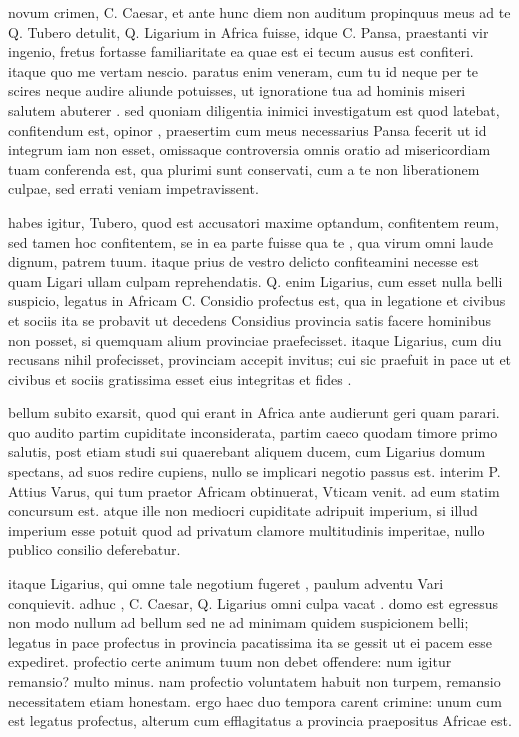 
 novum crimen, C. Caesar, et ante hunc diem non auditum propinquus meus ad te Q. Tubero detulit, Q. Ligarium in Africa fuisse, idque C. Pansa, praestanti vir ingenio, fretus fortasse familiaritate ea quae est ei tecum ausus est confiteri. itaque quo me vertam nescio. paratus enim veneram, cum tu id neque per te scires neque audire aliunde potuisses, ut ignoratione tua ad hominis miseri salutem abuterer . sed quoniam diligentia inimici investigatum est quod latebat, confitendum est, opinor , praesertim cum meus necessarius Pansa fecerit ut id integrum iam non esset, omissaque controversia omnis oratio ad misericordiam tuam conferenda est, qua plurimi sunt conservati, cum a te non liberationem culpae, sed errati veniam impetravissent.

 habes igitur, Tubero, quod est accusatori maxime optandum, confitentem reum, sed tamen hoc confitentem, se in ea parte fuisse qua te , qua virum omni laude dignum, patrem tuum. itaque prius de vestro delicto confiteamini necesse est quam Ligari ullam culpam reprehendatis. Q. enim Ligarius, cum esset nulla belli suspicio, legatus in Africam C. Considio profectus est, qua in legatione et civibus et sociis ita se probavit ut decedens Considius provincia satis facere hominibus non posset, si quemquam alium provinciae praefecisset. itaque Ligarius, cum diu recusans nihil profecisset, provinciam accepit invitus; cui sic praefuit in pace ut et civibus et sociis gratissima esset eius integritas et fides .

 bellum subito exarsit, quod qui erant in Africa ante audierunt geri quam parari. quo audito partim cupiditate inconsiderata, partim caeco quodam timore primo salutis, post etiam studi sui quaerebant aliquem ducem, cum Ligarius domum spectans, ad suos redire cupiens, nullo se implicari negotio passus est. interim P. Attius Varus, qui tum praetor Africam obtinuerat, Vticam venit. ad eum statim concursum est. atque ille non mediocri cupiditate adripuit imperium, si illud imperium esse potuit quod ad privatum clamore multitudinis imperitae, nullo publico consilio deferebatur.

 itaque Ligarius, qui omne tale negotium fugeret , paulum adventu Vari conquievit. adhuc , C. Caesar, Q. Ligarius omni culpa vacat . domo est egressus non modo nullum ad bellum sed ne ad minimam quidem suspicionem belli; legatus in pace profectus in provincia pacatissima ita se gessit ut ei pacem esse expediret. profectio certe animum tuum non debet offendere: num igitur remansio? multo minus. nam profectio voluntatem habuit non turpem, remansio necessitatem etiam honestam. ergo haec duo tempora carent crimine: unum cum est legatus profectus, alterum cum efflagitatus a provincia praepositus Africae est.

